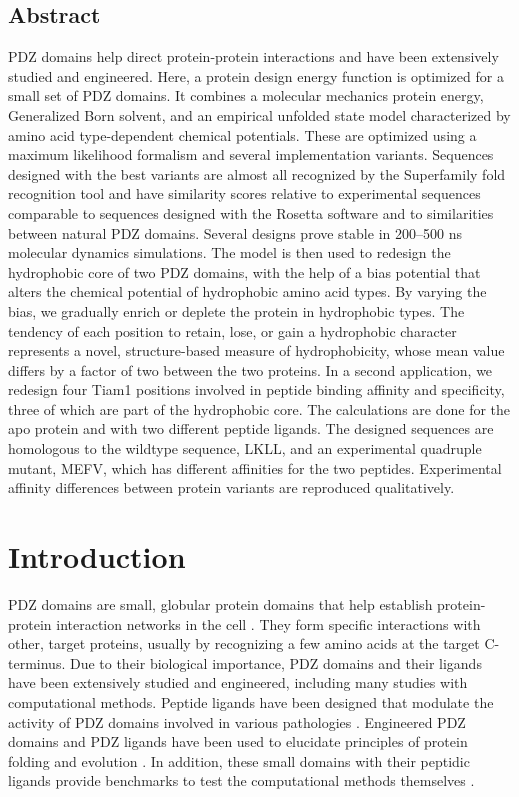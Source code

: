 \documentclass[12pt]{article}
\begin{document}
\subsection*{Abstract}
PDZ domains help direct protein-protein interactions and have been extensively studied and engineered. Here, a protein design
energy function is optimized for a small set of PDZ domains. It combines a molecular mechanics protein energy, Generalized Born
solvent, and an empirical unfolded state model characterized by amino acid type-dependent chemical potentials. These are
optimized using a maximum likelihood formalism and several implementation variants. Sequences designed with the best variants
are almost all recognized by the Superfamily fold recognition tool and have similarity scores relative to experimental sequences
comparable to sequences designed with the Rosetta software and to similarities between natural PDZ domains. Several designs
prove stable in 200--500 ns molecular dynamics simulations. The model is then used to redesign the hydrophobic core of two
PDZ domains, with the help of a bias potential that alters the chemical potential of hydrophobic amino acid types. By varying
the bias, we gradually enrich or deplete the protein in hydrophobic types. The tendency of each position to retain, lose, or
gain a hydrophobic character represents a novel, structure-based measure of hydrophobicity, whose mean value differs by a factor
of two between the two proteins. In a second application, we redesign four Tiam1 positions involved in peptide  binding affinity
and specificity, three of which are part of the hydrophobic core. The calculations are done for the apo protein and with two
different peptide ligands. The designed sequences are homologous to the wildtype sequence, LKLL, and an experimental quadruple
mutant, MEFV, which has different affinities for the two peptides. Experimental affinity differences between protein variants
are reproduced qualitatively.

\parindent 8mm

\pagebreak

\section{Introduction}
PDZ domains are small, globular protein domains that help establish protein-protein interaction networks in the cell
\cite{Harris01,Hung02,Tonikian08,Gfeller11,Subbaiah11,Sheperd11r}. They form specific interactions with other, target
proteins, usually by recognizing a few amino acids at the target C-terminus. Due to their biological importance, PDZ domains
and their ligands have been extensively studied and engineered, including many studies with computational methods. Peptide
ligands have been designed that modulate the activity of PDZ domains involved in various pathologies \cite{Bach12,Roberts12,
Zheng15}. Engineered PDZ domains and PDZ ligands have been used to elucidate principles of protein folding and evolution
\cite{Socolich05,Kong09,Mclaughlin12,Melero14}. In addition, these small domains with their peptidic ligands provide benchmarks
to test the computational methods themselves \cite{Reina02,Schmidt10,Smith10}.
\end{document}
